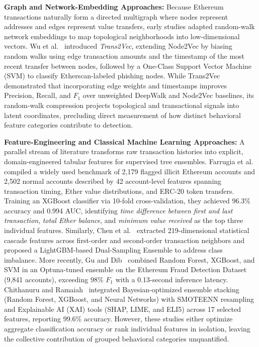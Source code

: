 \documentclass[conference]{IEEEtran}
\begin{document}
\textbf{Graph and Network-Embedding Approaches:} Because Ethereum transactions naturally form a directed multigraph where nodes represent addresses and edges represent value transfers, early studies adapted random-walk network embeddings to map topological neighborhoods into low-dimensional vectors. Wu et al.~\cite{wu2020} introduced \emph{Trans2Vec}, extending Node2Vec by biasing random walks using edge transaction amounts and the timestamp of the most recent transfer between nodes, followed by a One-Class Support Vector Machine (SVM) to classify Etherscan-labeled phishing nodes. While Trans2Vec demonstrated that incorporating edge weights and timestamps improves Precision, Recall, and $F_1$ over unweighted DeepWalk and Node2Vec baselines, its random-walk compression projects topological and transactional signals into latent coordinates, precluding direct measurement of how distinct behavioral feature categories contribute to detection.

\textbf{Feature-Engineering and Classical Machine Learning Approaches:} A parallel stream of literature transforms raw transaction histories into explicit, domain-engineered tabular features for supervised tree ensembles. Farrugia et al.~\cite{farrugia2020} compiled a widely used benchmark of 2,179 flagged illicit Ethereum accounts and 2,502 normal accounts described by 42 account-level features spanning transaction timing, Ether value distributions, and ERC-20 token transfers. Training an XGBoost classifier via 10-fold cross-validation, they achieved 96.3\% accuracy and 0.994 AUC, identifying \emph{time difference between first and last transaction}, \emph{total Ether balance}, and \emph{minimum value received} as the top three individual features. Similarly, Chen et al.~\cite{chen2020ijcai} extracted 219-dimensional statistical cascade features across first-order and second-order transaction neighbors and proposed a LightGBM-based Dual-Sampling Ensemble to address class imbalance. More recently, Gu and Dib~\cite{gu2025} combined Random Forest, XGBoost, and SVM in an Optuna-tuned ensemble on the Ethereum Fraud Detection Dataset (9,841 accounts), exceeding 98\% $F_1$ with a 0.13-second inference latency. Chithanuru and Ramaiah~\cite{chithanuru2025} integrated Bayesian-optimized ensemble stacking (Random Forest, XGBoost, and Neural Networks) with SMOTEENN resampling and Explainable AI (XAI) tools (SHAP, LIME, and ELI5) across 17 selected features, reporting 99.6\% accuracy. However, these studies either optimize aggregate classification accuracy or rank individual features in isolation, leaving the collective contribution of grouped behavioral categories unquantified.
\end{document}
